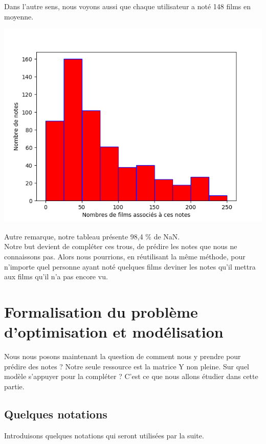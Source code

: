 \documentclass[a4paper,10pt]{article}
\begin{document}
Dans l’autre sens, nous voyons aussi que chaque utilisateur a noté 148 films en moyenne.

\includegraphics[scale=0.5]{hist1.png}

Autre remarque, notre tableau présente 98,4 \% de NaN.\\

Notre but devient de compléter ces trous, de prédire les notes que nous ne connaissons pas. Alors nous pourrions, en réutilisant la même méthode, pour n'importe quel personne ayant noté quelques films deviner les notes qu'il mettra aux films qu'il n'a pas encore vu.

\section{Formalisation du problème d'optimisation et modélisation}

Nous nous posons maintenant la question de comment nous y prendre pour prédire des notes ?
Notre seule ressource est la matrice Y non pleine. Sur quel modèle s'appuyer pour la compléter ?
C'est ce que nous allons étudier dans cette partie.

\subsection{Quelques notations}

Introduisons quelques notations qui seront utilisées par la suite.\\
\end{document}
